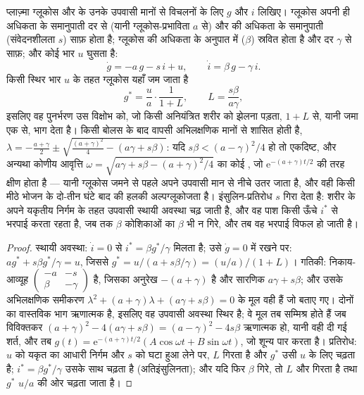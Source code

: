 \begin{theorem}[इंसुलिन--ग्लूकोस पाश]\label{thm:b3:endocrinology:loop}
प्लाज़्मा ग्लूकोस और  के उनके उपवासी मानों से विचलनों के लिए
$g$ और $i$ लिखिए। ग्लूकोस अपनी ही अधिकता के समानुपाती दर से (यानी
ग्लूकोस-प्रभाविता $a$ से) और  की अधिकता के समानुपाती (संवेदनशीलता
$s$) साफ़ होता है;  ग्लूकोस की अधिकता के अनुपात में ($\beta$)
स्रवित होता है और दर $\gamma$ से साफ़; और कोई भार $u$ घुसता है:
\[
\dot g = -a\,g - s\,i + u, \qquad \dot i = \beta\,g - \gamma\,i .
\]
किसी स्थिर भार $u$ के तहत ग्लूकोस यहाँ जम जाता है
\[
g^{*} = \frac{u}{a}\cdot\frac{1}{1 + L}, \qquad L = \frac{s\beta}{a\gamma},
\]
इसलिए वह पुनर्भरण उस विक्षोभ को, जो किसी अनियंत्रित शरीर को झेलना
पड़ता, $1 + L$ से, यानी \emph{} जमा एक से, भाग देता है। किसी
बोलस के बाद वापसी अभिलक्षणिक मानों से शासित होती है,
$\lambda = -\tfrac{a + \gamma}{2} \pm \sqrt{\tfrac{(a+\gamma)^{2}}{4} - (a\gamma + s\beta)}$:
यदि $s\beta < (a - \gamma)^{2}/4$ हो तो एकदिष्ट, और अन्यथा कोणीय
आवृत्ति $\omega = \sqrt{a\gamma + s\beta -
(a+\gamma)^{2}/4}$ का कोई , जो $\mathrm{e}^{-(a+\gamma)t/2}$
की तरह क्षीण होता है --- यानी ग्लूकोस जमने से पहले अपने उपवासी मान से
नीचे उतर जाता है, और वही किसी मीठे भोजन के दो-तीन घंटे बाद की हलकी
अल्पग्लूकोजता है। इंसुलिन-प्रतिरोध $s$ गिरा देता है: शरीर के अपने
यकृतीय निर्गम के तहत उपवासी स्थायी अवस्था चढ़ जाती है, और वह पाश किसी
ऊँचे $i^{*}$ से भरपाई करता रहता है, जब तक $\beta$ कोशिकाओं का $\beta$
भी न गिरे, और तब वह भरपाई विफल हो जाती है।
\end{theorem}
\begin{proof}
स्थायी अवस्था: $\dot i = 0$ से $i^{*} = \beta g^{*}/\gamma$ मिलता है;
उसे $\dot g = 0$ में रखने पर: $a g^{*} + s\beta g^{*}/\gamma = u$,
जिससे $g^{*} =
u/(a + s\beta/\gamma) = (u/a)/(1 + L)$। गतिकी: निकाय-आव्यूह
$\begin{pmatrix} -a & -s\\ \beta & -\gamma\end{pmatrix}$ है, जिसका
अनुरेख $-(a+\gamma)$ है और सारणिक $a\gamma + s\beta$; और उसके
अभिलक्षणिक समीकरण $\lambda^{2} + (a+\gamma)\lambda + (a\gamma + s\beta) = 0$
के मूल वही हैं जो बताए गए। दोनों का वास्तविक भाग ऋणात्मक है, इसलिए वह
उपवासी अवस्था स्थिर है; वे मूल तब सम्मिश्र होते हैं जब विविक्तकर
$(a+\gamma)^{2}
- 4(a\gamma + s\beta) = (a-\gamma)^{2} - 4s\beta$ ऋणात्मक हो, यानी वही
दी गई शर्त, और तब $g(t) = \mathrm{e}^{-(a+\gamma)t/2}(A\cos\omega t
+ B\sin\omega t)$, जो शून्य पार करता है। प्रतिरोध: $u$ को यकृत का
आधारी निर्गम और $s$ को घटा हुआ लेने पर, $L$ गिरता है और $g^{*}$ उसी
$u$ के लिए चढ़ता है; $i^{*} = \beta g^{*}/\gamma$ उसके साथ चढ़ता है
(अतिइंसुलिनता); और यदि फिर $\beta$ गिरे, तो $L$ और गिरता है तथा
$g^{*}$ $u/a$ की ओर चढ़ता जाता है।
\end{proof}

